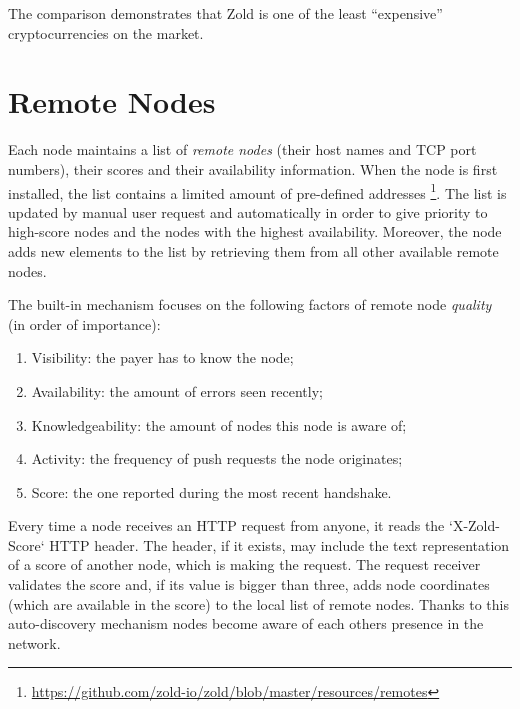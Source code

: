 \documentclass[11pt,oneside]{article}
\begin{document}
The comparison demonstrates that Zold is one of the least ``expensive''
cryptocurrencies on the market.

\section{Remote Nodes}\label{sec:remotes}

Each node maintains a list of \emph{remote nodes} (their host names and TCP port numbers),
their scores and their availability information. When the node is first installed,
the list contains a limited amount of pre-defined addresses%
\footnote{\url{https://github.com/zold-io/zold/blob/master/resources/remotes}}.
The list is updated by manual user request and automatically in order to give priority
to high-score nodes and the nodes with the highest availability.
Moreover, the node adds new elements to the list by retrieving them from all other
available remote nodes.

The built-in mechanism focuses on the following factors of
remote node \emph{quality} (in order of importance):

\begin{enumerate}
  \item Visibility: the payer has to know the node;
  \item Availability: the amount of errors seen recently;
  \item Knowledgeability: the amount of nodes this node is aware of;
  \item Activity: the frequency of push requests the node originates;
  \item Score: the one reported during the most recent handshake.
\end{enumerate}

Every time a node receives an HTTP request from anyone, it reads the
`X-Zold-Score` HTTP header. The header, if it exists, may include
the text representation of a score of another node, which is making
the request. The request receiver validates the score and, if its
value is bigger than three, adds node coordinates (which are
available in the score) to the local list of remote nodes. Thanks to this
auto-discovery mechanism nodes become aware of each others presence
in the network.
\end{document}
